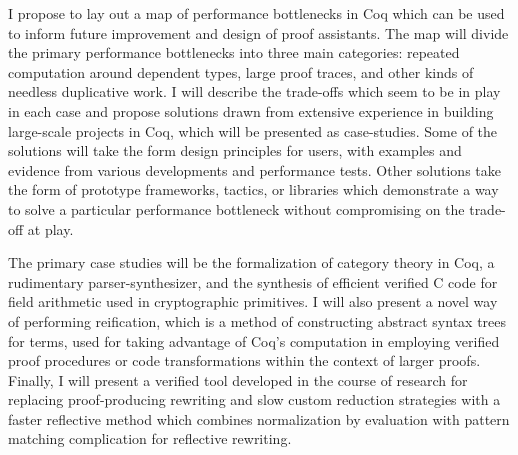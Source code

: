 \documentclass[twoside]{article}
\begin{document}
{I propose to lay out a map of performance bottlenecks in Coq which can be used to inform future improvement and design of proof assistants.
The map will divide the primary performance bottlenecks into three main categories: repeated computation around dependent types, large proof traces, and other kinds of needless duplicative work.
I will describe the trade-offs which seem to be in play in each case and propose solutions drawn from extensive experience in building large-scale projects in Coq, which will be presented as case-studies.
Some of the solutions will take the form design principles for users, with examples and evidence from various developments and performance tests.
Other solutions take the form of prototype frameworks, tactics, or libraries which demonstrate a way to solve a particular performance bottleneck without compromising on the trade-off at play.

The primary case studies will be the formalization of category theory in Coq, a rudimentary parser-synthesizer, and the synthesis of efficient verified C code for field arithmetic used in cryptographic primitives.
I will also present a novel way of performing reification, which is a method of constructing abstract syntax trees for terms, used for taking advantage of Coq's computation in employing verified proof procedures or code transformations within the context of larger proofs.
Finally, I will present a verified tool developed in the course of research for replacing proof-producing rewriting and slow custom reduction strategies with a faster reflective method which combines normalization by evaluation with pattern matching complication for reflective rewriting.

}
\end{document}
